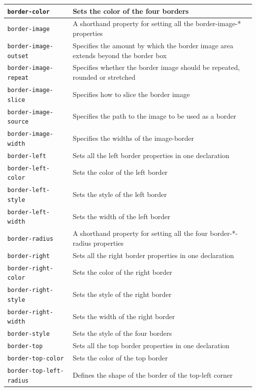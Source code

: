 \documentclass[11pt, letterpaper]{article}
\begin{document}
\begin{longtable}{p{5cm} p{10cm}}
				\texttt{border-color} & Sets the color of the four borders \\\midrule
				\texttt{border-image} & A shorthand property for setting all the border-image-* properties \\\midrule
				\texttt{border-image-outset} & Specifies the amount by which the border image area extends beyond the border box \\\midrule
				\texttt{border-image-repeat} & Specifies whether the border image should be repeated, rounded or stretched \\\midrule
				\texttt{border-image-slice} & Specifies how to slice the border image \\\midrule
				\texttt{border-image-source} & Specifies the path to the image to be used as a border \\\midrule
				\texttt{border-image-width} & Specifies the widths of the image-border \\\midrule
				\texttt{border-left} & Sets all the left border properties in one declaration \\\midrule
				\texttt{border-left-color} & Sets the color of the left border \\\midrule
				\texttt{border-left-style} & Sets the style of the left border \\\midrule
				\texttt{border-left-width} & Sets the width of the left border \\\midrule
				\texttt{border-radius} & A shorthand property for setting all the four border-*-radius properties \\\midrule
				\texttt{border-right} & Sets all the right border properties in one declaration \\\midrule
				\texttt{border-right-color} & Sets the color of the right border \\\midrule
				\texttt{border-right-style} & Sets the style of the right border \\\midrule
				\texttt{border-right-width} & Sets the width of the right border \\\midrule
				\texttt{border-style} & Sets the style of the four borders \\\midrule
				\texttt{border-top} & Sets all the top border properties in one declaration \\\midrule
				\texttt{border-top-color} & Sets the color of the top border \\\midrule
				\texttt{border-top-left-radius} & Defines the shape of the border of the top-left corner \\\midrule

\end{longtable}
\end{document}
